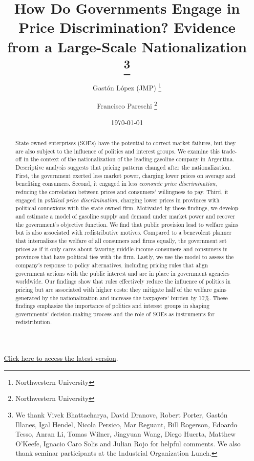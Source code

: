 \documentclass{gaston-paper-template}
\title{ \vspace*{-2.5cm} \hspace*{-0.5cm}How Do Governments Engage in Price Discrimination? Evidence from a Large-Scale Nationalization \footnote{
    We thank Vivek Bhattacharya, David Dranove, Robert Porter, Gast\'on Illanes, Igal Hendel, Nicola Persico, Mar Reguant, Bill Rogerson, Edoardo Tesso, Anran Li, Tomas Wilner, Jingyuan Wang, Diego Huerta, Matthew O'Keefe, Ignacio Caro Solis and Julian Rojo for helpful comments. We also thank seminar participants at the Industrial Organization Lunch.
}}
\author{Gast\'on L\'opez (JMP) \thanks{Northwestern University} 
\and Francisco Pareschi \thanks{Northwestern University}}
\date{\today}
\begin{document}
\begin{singlespace}
\maketitle 


\centering 
\href{https://gaston-lopez.github.io/GastonLopez-JMP-latest.pdf}{Click here to access the latest version}.


\begin{abstract}
    State-owned enterprises (SOEs) have the potential to correct market failures, but they are also subject to the influence of politics and interest groups. We examine this trade-off in the context of the nationalization of the leading gasoline company in Argentina. Descriptive analysis suggests that pricing patterns changed after the nationalization. First, the government exerted less market power, charging lower prices on average and benefiting consumers. Second, it engaged in less \emph{economic price discrimination}, reducing the correlation between prices and consumers' willingness to pay. Third, it engaged in \emph{political price discrimination}, charging lower prices in provinces with political connexions with the state-owned firm. Motivated by these findings, we develop and estimate a model of gasoline supply and demand under market power and recover the government's objective function. We find that public provision lead to welfare gains but is also associated with redistributive motives. Compared to a benevolent planner that internalizes the welfare of all consumers and firms equally, the government set prices as if it only cares about favoring middle-income consumers and consumers in provinces that have political ties with the firm. Lastly, we use the model to assess the company’s response to policy alternatives, including pricing rules that align government actions with the public interest and are in place in government agencies worldwide. Our findings show that rules effectively reduce the influence of politics in pricing but are associated with higher costs: they mitigate half of the welfare gains generated by the nationalization and increase the taxpayers' burden by 10\%. These findings emphasize the importance of politics and interest groups in shaping governments' decision-making process and the role of SOEs as instruments for redistribution.
    \end{abstract}
\end{singlespace}

    
\end{document}
